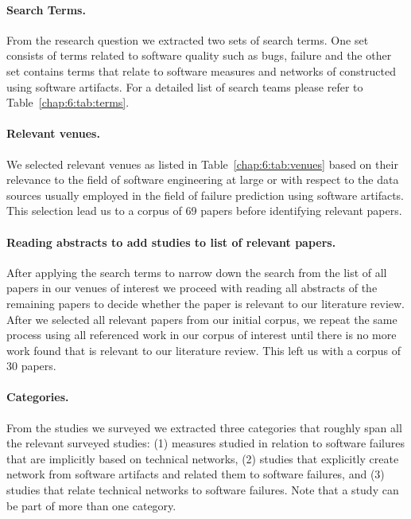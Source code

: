 \paragraph{Search Terms.} From the research question we extracted two sets of search terms.
One set consists of terms related to software quality such as bugs, failure and the other set contains terms that relate to software measures and networks of constructed using software artifacts.
For a detailed list of search teams please refer to Table~\ref{chap:6:tab:terms}.

\paragraph{Relevant venues.} We selected relevant venues as listed in Table~\ref{chap:6:tab:venues} based on their relevance to the field of software engineering at large or with respect to the data sources usually employed in the field of failure prediction using software artifacts.
This selection lead us to a corpus of 69 papers before identifying relevant papers.

\paragraph{Reading abstracts to add studies to list of relevant papers.} After applying the search terms to narrow down the search from the list of all papers in our venues of interest we proceed with reading all abstracts of the remaining papers to decide whether the paper is relevant to our literature review.
%
After we selected all relevant papers from our initial corpus, we repeat the same process using all referenced work in our corpus of interest until there is no more work found that is relevant to our literature review.
This left us with a corpus of 30 papers.

\paragraph{Categories.} From the studies we surveyed we extracted three categories that roughly span all the relevant surveyed studies:
(1) measures studied in relation to software failures that are implicitly based on technical networks,
(2) studies that explicitly create network from software artifacts and related them to software failures,
and (3) studies that relate technical networks to software failures.
Note that a study can be part of more than one category.

